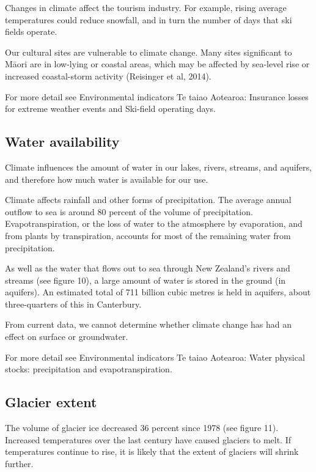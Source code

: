 \documentclass[11pt]{mfe-nzers} %
\begin{document}
Changes in climate affect the tourism industry. For example, rising average temperatures could reduce snowfall, and in turn the number of days that ski fields operate.

Our cultural sites are vulnerable to climate change. Many sites significant to Māori are in low-lying or coastal areas, which may be affected by sea-level rise or increased coastal-storm activity (Reisinger et al, 2014).

For more detail see Environmental indicators Te taiao Aotearoa: Insurance losses for extreme weather events and Ski-field operating days.

\subsection{Water availability}
Climate influences the amount of water in our lakes, rivers, streams, and aquifers, and therefore how much water is available for our use.

Climate affects rainfall and other forms of precipitation. The average annual outflow to sea is around 80 percent of the volume of precipitation. Evapotranspiration, or the loss of water to the atmosphere by evaporation, and from plants by transpiration, accounts for most of the remaining water from precipitation.

As well as the water that flows out to sea through New Zealand’s rivers and streams (see figure 10), a large amount of water is stored in the ground (in aquifers). An estimated total of 711 billion cubic metres is held in aquifers, about three-quarters of this in Canterbury.


From current data, we cannot determine whether climate change has had an effect on surface or groundwater.

For more detail see Environmental indicators Te taiao Aotearoa: Water physical stocks: precipitation and evapotranspiration.

\subsection{Glacier extent}
The volume of glacier ice decreased 36 percent since 1978 (see figure 11). Increased temperatures over the last century have caused glaciers to melt. If temperatures continue to rise, it is likely that the extent of glaciers will shrink further.

\end{document}
